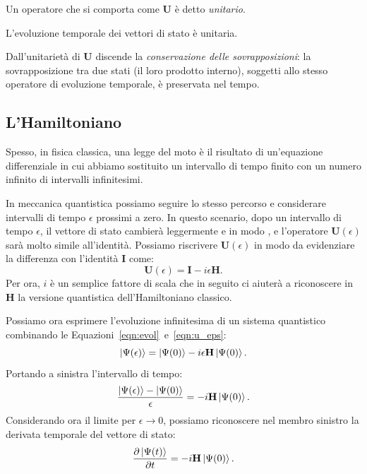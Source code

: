 Un operatore che si comporta come $\mathbf{U}$ è detto \emph{unitario}.
\begin{principles}
	L'evoluzione temporale dei vettori di stato è unitaria. 
\end{principles}

Dall'unitarietà di $\mathbf{U}$ discende la \emph{conservazione delle sovrapposizioni}: la sovrapposizione tra due stati (il loro prodotto interno), soggetti allo stesso operatore di evoluzione temporale, è preservata nel tempo.

\subsection{L'Hamiltoniano}
\label{sec:hamiltonian}
Spesso, in fisica classica, una legge del moto è il risultato di un'equazione differenziale in cui abbiamo sostituito un intervallo di tempo finito con un numero infinito di intervalli infinitesimi. 

In meccanica quantistica possiamo seguire lo stesso percorso e considerare intervalli di tempo $\epsilon$ prossimi a zero. In questo scenario, dopo un intervallo di tempo $\epsilon$, il vettore di stato cambierà leggermente e in modo , e l'operatore $\mathbf{U}(\epsilon)$ sarà molto simile all'identità. Possiamo riscrivere $\mathbf{U}(\epsilon)$ in modo da evidenziare la differenza con l'identità $\mathbf{I}$ come:
\begin{equation}
	\label{eqn:u_eps}
	\mathbf{U}(\epsilon) = \mathbf{I} - i\epsilon \mathbf{H}.
\end{equation}
Per ora, $i$ è un semplice fattore di scala che in seguito ci aiuterà a riconoscere in $\mathbf{H}$ la versione quantistica dell'Hamiltoniano classico.

Possiamo ora esprimere l'evoluzione infinitesima di un sistema quantistico combinando le Equazioni~\ref{eqn:evol}~e~\ref{eqn:u_eps}:
\[
\Ket{\Psi(\epsilon)} = \Ket{\Psi(0)} - i \epsilon\mathbf{H}\Ket{\Psi(0)}.
\]
Portando a sinistra l'intervallo di tempo:
\[
\frac{\Ket{\Psi(\epsilon)} - \Ket{\Psi(0)}}{\epsilon} =  - i\mathbf{H}\Ket{\Psi(0)}.
\]
Considerando ora il limite per $\epsilon \to 0$, possiamo riconoscere nel membro sinistro la derivata temporale del vettore di stato:
\[
\frac{\partial\Ket{\Psi(t)}}{\partial t} = - i \mathbf{H}\Ket{\Psi(0)}.
\]

